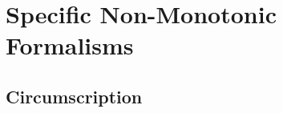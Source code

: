 \documentclass[8pt]{beamer}
\newcommand{\myfootnote}[1]{
    \renewcommand{\thefootnote}{}
    \footnotetext{\hspace{-4pt}\scriptsize#1}
    \renewcommand{\thefootnote}{\arabic{footnote}}
}
\newcommand*{\skepcon}{\ensuremath{\mathrel{\medvert\mskip-5.7mu\clipbox{1 0 0 0}{$\sim$}}}}
\begin{document}
\begin{comment}

\subsubsection{Meta Theoretic Approach}
\begin{frame}{Preferential Non-Monotonic Reasoning: Meta Theoretic Approach}
Important meta-theoretical properties:
\begin{prooftree}
\AxiomC{$\varphi \skepcon \psi$}
\AxiomC{$\varphi \skepcon \chi$}
\RightLabel{\scriptsize(Cautious Monotonicity)}
\BinaryInfC{$\varphi \wedge \psi \skepcon \chi$}
\end{prooftree}

allows for the formalisation of \emph{Lemmas} and 

\begin{prooftree}
\AxiomC{$\varphi \skepcon \chi$}
\AxiomC{$\psi \skepcon \chi$}
\RightLabel{\scriptsize(Or)}
\BinaryInfC{$\varphi \vee \psi \skepcon \chi$}
\end{prooftree}

enables the reasoning about cases. \\
\metroset{block=fill}

\begin{block}{Cumulative Models and Preferential Models}
Cumulative Models and Preferential Models captured on meta-theoretic level (System \textbf{C} and \textbf{P} = \textbf{C} + Or)
\end{block}
\begin{block}{Cumulative Models and Preferential Models}
Every model preference logic has a preferential inference relation.  
\end{block}
\myfootnote{\cite{kraus1990nonmonotonic, brewka1997nonmonotonic}}
\end{frame}

\end{comment}

\section{Specific Non-Monotonic Formalisms}
\subsection{Circumscription}
\end{document}
